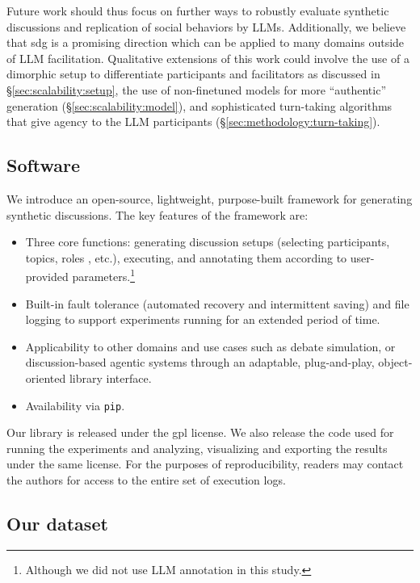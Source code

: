 Future work should thus focus on further ways to robustly evaluate synthetic discussions and replication of social behaviors by LLMs. Additionally, we believe that \ac{sdg} is a promising direction which can be applied to many domains outside of LLM facilitation. Qualitative extensions of this work could involve the use of a dimorphic setup to differentiate participants and facilitators as discussed in \S\ref{sec:scalability:setup}, the use of non-finetuned models for more ``authentic'' generation (\S\ref{sec:scalability:model}), and sophisticated turn-taking algorithms that give agency to the LLM participants (\S\ref{sec:methodology:turn-taking}).


\subsection{Software}
\label{sec:discussion:software}

We introduce an open-source, lightweight, purpose-built framework for generating synthetic discussions. The key features of the framework are: 
\begin{itemize}[nosep,noitemsep]
    \item Three core functions: generating discussion setups (selecting participants, topics, roles , etc.), executing, and annotating them according to user-provided parameters.\footnote{Although we did not use LLM annotation in this study.}
    \item Built-in fault tolerance (automated recovery and intermittent saving) and file logging to support experiments running for an extended period of time.
    \item Applicability to other domains and use cases such as debate simulation, or discussion-based agentic systems through an adaptable, plug-and-play, object-oriented library interface.
    \item Availability via \texttt{pip}.
\end{itemize}

Our library is released under the \ac{gpl} license. We also release the code used for running the experiments and analyzing, visualizing and exporting the results under the same license. For the purposes of reproducibility, readers may contact the authors for access to the entire set of execution logs.


\subsection{Our dataset}
\label{sec:discussion:data}

